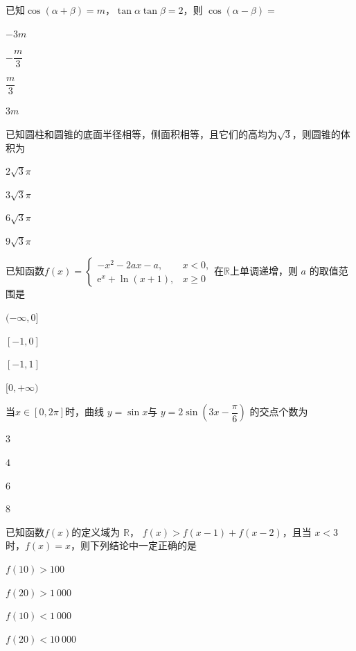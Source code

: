 \documentclass[a4paper, 11pt]{article}
\newcommand{\e}{\mathrm{e}}
\begin{document}
\begin{question}
	已知$\cos(\alpha+\beta)=m$，$\tan\alpha\tan\beta=2$，则 $\cos(\alpha-\beta)=$
	\begin{choices}
		\item $-3m$
		\item $-\dfrac{m}{3}$
		\item $\dfrac{m}{3}$
		\item $3m$
	\end{choices}
\end{question}

\begin{question}
	已知圆柱和圆锥的底面半径相等，侧面积相等，且它们的高均为$\sqrt 3$，则圆锥的体积为
	\begin{choices}
		\item $2\sqrt 3\pi$
		\item $3\sqrt 3\pi$
		\item $6\sqrt 3\pi$
		\item $9\sqrt 3\pi$
	\end{choices}
\end{question}

\begin{question}
	已知函数$f(x)=
	\begin{cases}
		-x^2-2ax-a, &x<0, \\ \e^x+\ln(x+1), &x\geqslant 0
	\end{cases}$在$\mathbb R$上单调递增，则 $a$ 的取值范围是
	\begin{choices}
	\item $(-\infty,0]$
	\item $[-1,0]$
	\item $[-1,1]$
		\item $[0,+\infty)$
	\end{choices}
\end{question}

\begin{question}
	当$x\in[0,2\pi]$时，曲线 $y=\sin x$与 $y=2\sin\left(3x-\dfrac{\pi}{6}\right)$ 的交点个数为
	\begin{choices}
		\item $3$
		\item $4$
		\item $6$
		\item $8$
	\end{choices}
\end{question}

\begin{question}
	已知函数$f(x)$的定义域为 $\mathbb R$， $f(x)>f(x-1)+f(x-2)$，且当 $x<3$时，$f(x)=x$，则下列结论中一定正确的是
	
	\begin{choices}
		\item $f(10)>100$
		\item $f(20)>1\: 000$
		\item $f(10)<1\: 000$
		\item $f(20)<10\: 000$
	\end{choices}
\end{question}
\end{document}
